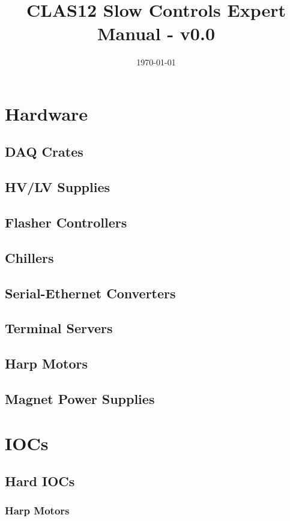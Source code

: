 \documentclass[amsmath,amssymb,notitlepage,11pt]{revtex4}
\begin{document}
\title{CLAS12 Slow Controls Expert Manual - v0.0}
\date{\today}
\begin{abstract}
\end{abstract}

\maketitle
\tableofcontents
\newpage

\section{Hardware}
\subsection{DAQ Crates}
\subsection{HV/LV Supplies}
\subsection{Flasher Controllers}
\subsection{Chillers}
\subsection{Serial-Ethernet Converters}
\subsection{Terminal Servers}
\subsection{Harp Motors}
\subsection{Magnet Power Supplies}

\section{IOCs}

\subsection{Hard IOCs}
\subsubsection{Harp Motors}
\end{document}
